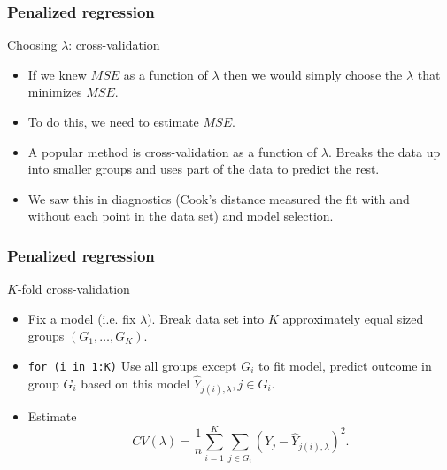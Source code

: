 \documentclass[handout]{beamer}
\begin{document}
   \begin{frame} \frametitle{Penalized regression}

   \begin{block}
   {Choosing $\lambda$: cross-validation  }
       \begin{itemize}

       \item If we knew $MSE$ as a function of $\lambda$ then we would simply choose the $\lambda$ that minimizes $MSE$.

       \item To do this, we need to estimate $MSE$.

       \item A popular method is cross-validation as a function
       of $\lambda$. Breaks the data up into smaller groups and uses part of the data to predict the rest.

       \item We saw this in diagnostics (Cook's distance measured the fit with and without each point in the data set) and model selection.
       \end{itemize}

   \end{block}
   \end{frame}


   \begin{frame} \frametitle{Penalized regression}

   \begin{block}
   {$K$-fold cross-validation                     }
       \begin{itemize}

       \item Fix a model (i.e. fix $\lambda$). Break data set into $K$ approximately equal sized groups $(G_1, \dots, G_K)$.

       \item {\tt for (i in 1:K)} Use all groups except $G_i$ to fit model, predict  outcome in group $G_i$ based on this model $\widehat{Y}_{j(i),\lambda}, j \in G_i$.

       \item Estimate
   $$
   CV(\lambda) = \frac{1}{n}\sum_{i=1}^K \sum_{j \in G_i} (Y_j - \widehat{Y}_{j(i),\lambda})^2.$$
       \end{itemize}

   \end{block}
   \end{frame}
\end{document}
